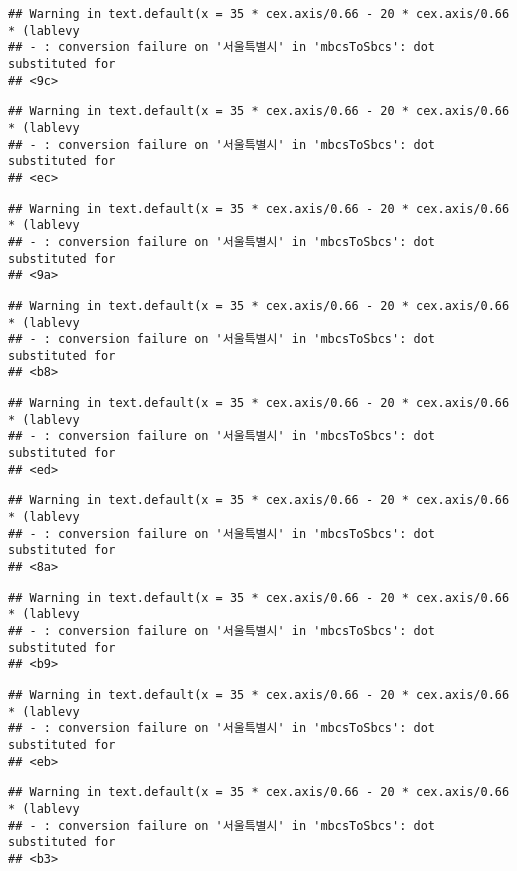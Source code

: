 \documentclass[
]{article}
\begin{document}
\begin{verbatim}
## Warning in text.default(x = 35 * cex.axis/0.66 - 20 * cex.axis/0.66 * (lablevy
## - : conversion failure on '서울특별시' in 'mbcsToSbcs': dot substituted for
## <9c>
\end{verbatim}

\begin{verbatim}
## Warning in text.default(x = 35 * cex.axis/0.66 - 20 * cex.axis/0.66 * (lablevy
## - : conversion failure on '서울특별시' in 'mbcsToSbcs': dot substituted for
## <ec>
\end{verbatim}

\begin{verbatim}
## Warning in text.default(x = 35 * cex.axis/0.66 - 20 * cex.axis/0.66 * (lablevy
## - : conversion failure on '서울특별시' in 'mbcsToSbcs': dot substituted for
## <9a>
\end{verbatim}

\begin{verbatim}
## Warning in text.default(x = 35 * cex.axis/0.66 - 20 * cex.axis/0.66 * (lablevy
## - : conversion failure on '서울특별시' in 'mbcsToSbcs': dot substituted for
## <b8>
\end{verbatim}

\begin{verbatim}
## Warning in text.default(x = 35 * cex.axis/0.66 - 20 * cex.axis/0.66 * (lablevy
## - : conversion failure on '서울특별시' in 'mbcsToSbcs': dot substituted for
## <ed>
\end{verbatim}

\begin{verbatim}
## Warning in text.default(x = 35 * cex.axis/0.66 - 20 * cex.axis/0.66 * (lablevy
## - : conversion failure on '서울특별시' in 'mbcsToSbcs': dot substituted for
## <8a>
\end{verbatim}

\begin{verbatim}
## Warning in text.default(x = 35 * cex.axis/0.66 - 20 * cex.axis/0.66 * (lablevy
## - : conversion failure on '서울특별시' in 'mbcsToSbcs': dot substituted for
## <b9>
\end{verbatim}

\begin{verbatim}
## Warning in text.default(x = 35 * cex.axis/0.66 - 20 * cex.axis/0.66 * (lablevy
## - : conversion failure on '서울특별시' in 'mbcsToSbcs': dot substituted for
## <eb>
\end{verbatim}

\begin{verbatim}
## Warning in text.default(x = 35 * cex.axis/0.66 - 20 * cex.axis/0.66 * (lablevy
## - : conversion failure on '서울특별시' in 'mbcsToSbcs': dot substituted for
## <b3>
\end{verbatim}
\end{document}
